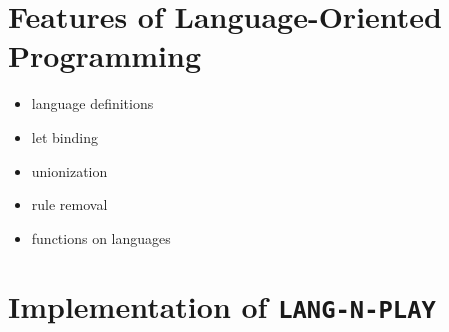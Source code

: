 

\section{Features of Language-Oriented Programming}
\begin{itemize}
  \item language definitions
  \item let binding
  \item unionization
  \item rule removal
  \item functions on languages 
\end{itemize}

\section{Implementation of \texttt{LANG-N-PLAY}}